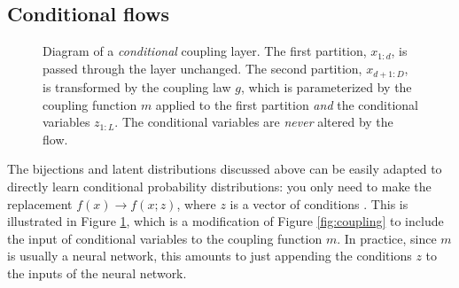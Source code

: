 \documentclass[twocolumn,twocolappendix]{aastex631}
\begin{document}
\subsection{Conditional flows}
\label{sec:conditional}

\begin{figure}
    \centering
    \caption{
        Diagram of a \emph{conditional} coupling layer.
        The first partition, $x^{}_{1:d}$, is passed through the layer unchanged.
        The second partition, $x^{}_{d+1:D}$, is transformed by the coupling law $g$, which is parameterized by the coupling function $m$ applied to the first partition \emph{and} the conditional variables $z^{}_{1:L}$.
        The conditional variables are \emph{never} altered by the flow.
    }
    \label{fig:conditional-coupling}
\end{figure}

The bijections and latent distributions discussed above can be easily adapted to directly learn conditional probability distributions:
you only need to make the replacement $f(x) \to f(x;z)$, where $z$ is a vector of conditions \citep{winkler2019}.
This is illustrated in Figure \ref{fig:conditional-coupling}, which is a modification of Figure \ref{fig:coupling} to include the input of conditional variables to the coupling function $m$.
In practice, since $m$ is usually a neural network, this amounts to just appending the conditions $z$ to the inputs of the neural network.
\end{document}
